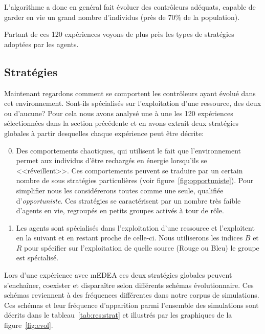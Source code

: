 \documentclass[a4paper,10pt]{report}
\begin{document}
L'algorithme a donc en genéral fait évoluer des contrôleurs adéquats, capable de garder en vie un grand nombre d'individus (près de 70\% de la population).

Partant de ces 120 expériences voyons de plus près les types de stratégies adoptées par les agents.

\subsection{Stratégies}
\label{sec:res:spec}
Maintenant regardons comment se comportent les contrôleurs ayant évolué dans cet environnement. Sont-ils spécialisés sur l'exploitation d'une ressource, des deux ou d'aucune? Pour cela nous avons analysé une à une les 120 expériences sélectionnées dans la section précédente et en avons extrait deux stratégies globales à partir desquelles chaque expérience peut être décrite:

\begin{enumerate}[S1:]\setcounter{enumi}{-1}
\item Des comportements chaotiques, qui utilisent le fait que l'environnement permet aux individus d'être rechargés en énergie lorsqu'ils se <<réveillent>>. Ces comportements peuvent se traduire par un certain nombre de sous stratégies particulières (voir figure~\ref{fig:opportuniste}). Pour simplifier nous les considérerons toutes comme une seule, qualifiée d'\emph{opportuniste}. Ces stratégies se caractérisent par un nombre très faible d'agents en vie, regroupés en petits groupes activés à tour de rôle. \label{itm:chaos}
\item Les agents sont spécialisés dans l'exploitation d'une ressource et l'exploitent en la suivant et en restant proche de celle-ci. Nous utiliserons les indices $B$ et $R$ pour spécifier sur l'exploitation de quelle source (Rouge ou Bleu) le groupe est spécialisé. \label{itm:1spe}
\end{enumerate}

Lors d'une expérience avec mEDEA ces deux stratégies globales peuvent s'enchaîner, coexister et disparaître selon différents schémas évolutionnaire. Ces schémas reviennent à des fréquences différentes dans notre corpus de simulations. Ces schémas et leur fréquence d'apparition parmi l'ensemble des simulations sont décrits dans le tableau~\ref{tab:res:strat} et illustrés par les graphiques de la figure~\ref{fig:evol}.
\end{document}
